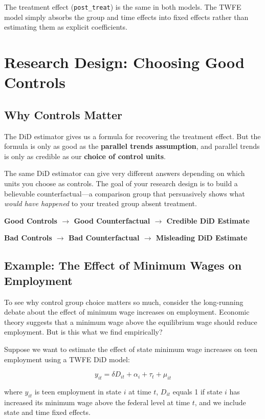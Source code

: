 \documentclass[
  letterpaper,
  DIV=11,
  numbers=noendperiod]{scrreprt}
\begin{document}
The treatment effect (\texttt{post\_treat}) is the same in both models.
The TWFE model simply absorbs the group and time effects into fixed
effects rather than estimating them as explicit coefficients.

\section{Research Design: Choosing Good
Controls}\label{research-design-choosing-good-controls}

\subsection{Why Controls Matter}\label{why-controls-matter}

The DiD estimator gives us a formula for recovering the treatment
effect. But the formula is only as good as the \textbf{parallel trends
assumption}, and parallel trends is only as credible as our
\textbf{choice of control units}.

The same DiD estimator can give very different answers depending on
which units you choose as controls. The goal of your research design is
to build a believable counterfactual---a comparison group that
persuasively shows what \emph{would have happened} to your treated group
absent treatment.

\textbf{Good Controls \(\rightarrow\) Good Counterfactual
\(\rightarrow\) Credible DiD Estimate}

\textbf{Bad Controls \(\rightarrow\) Bad Counterfactual \(\rightarrow\)
Misleading DiD Estimate}

\subsection{Example: The Effect of Minimum Wages on
Employment}\label{example-the-effect-of-minimum-wages-on-employment}

To see why control group choice matters so much, consider the
long-running debate about the effect of minimum wage increases on
employment. Economic theory suggests that a minimum wage above the
equilibrium wage should reduce employment. But is this what we find
empirically?

Suppose we want to estimate the effect of state minimum wage increases
on teen employment using a TWFE DiD model:

\[
y_{it} = \delta D_{it} + \alpha_i + \tau_t + \mu_{it}
\]

where \(y_{it}\) is teen employment in state \(i\) at time \(t\),
\(D_{it}\) equals 1 if state \(i\) has increased its minimum wage above
the federal level at time \(t\), and we include state and time fixed
effects.
\end{document}
